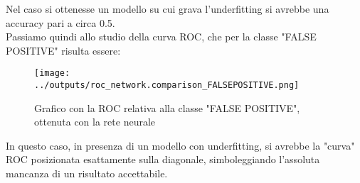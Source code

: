 Nel caso si ottenesse un modello su cui grava l'underfitting si avrebbe una 
accuracy pari a circa 0.5.\\
Passiamo quindi allo studio della curva ROC, che per la classe "FALSE POSITIVE"
risulta essere:
\begin{figure}[H]
    \centering
    \texttt{[image: ../outputs/roc\_network.comparison\_FALSEPOSITIVE.png]}
    \caption{Grafico con la ROC relativa alla classe "FALSE POSITIVE", ottenuta con 
    la rete neurale}
\end{figure}
In questo caso, in presenza di un modello con underfitting, 
si avrebbe la "curva" ROC posizionata esattamente sulla diagonale, 
simboleggiando l'assoluta mancanza di un risultato accettabile.